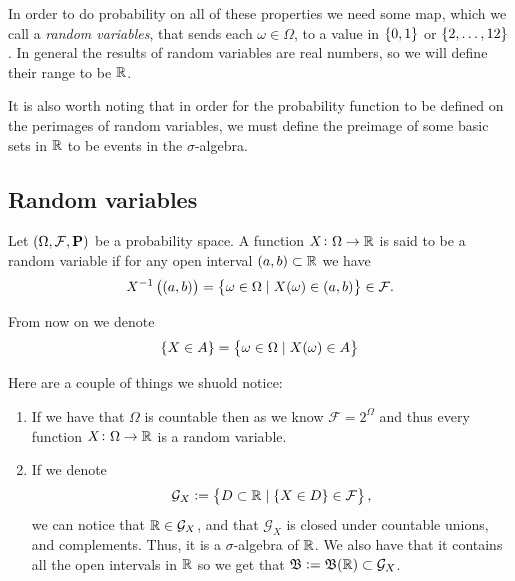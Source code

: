 \documentclass[11pt,a4paper]{article}
\begin{document}
In order to do probability on all of these properties we need some
map, which we call a \textit{random variables},
that sends each $\omega \in \Omega$,
to a value in $\left\{0,1\right\}$ or $\left\{2,\dots,12\right\}$.
In general the results of random variables are real numbers,
so we will define their range to be $\mathbb{R}$.

It is also worth noting that in order for the probability function
to be defined on the perimages of random variables,
we must define the preimage of some basic sets in $\mathbb{R}$ to be events
in the $\sigma$-algebra.

\subsection{Random variables}
\begin{definition}
  Let $(\Omega, \mathcal F, \mathbf{P})$ be a probability space.
  A function $X \colon \Omega \to \mathbb{R}$ is said to be a random variable if for
  any open interval $(a,b) \subset \mathbb{R}$ we have
  \[
    X^{-1}\left((a,b)\right) = 
    \left\{\omega \in \Omega \mid X(\omega) \in (a,b)\right\} \in \mathcal F.
  \]
\end{definition}
\begin{remark}
  From now on we denote
  \[
    \{X \in A\} = \left\{\omega \in \Omega \mid X(\omega) \in A\right\}
  \]
\end{remark}

Here are a couple of things we shuold notice:
\begin{enumerate}
  \item[(1)] If we have that $\Omega$ is countable then as we know 
  $\mathcal F = 2^\Omega$ and thus every function $X \colon \Omega \to \mathbb{R}$
  is a random variable.
  \item[(2)] If we denote 
  \[
    \mathcal G_X := \left\{D \subset \mathbb{R} \mid \left\{X \in D\right\} \in \mathcal F\right\},
  \]
  we can notice that $\mathbb{R} \in \mathcal G_X$, and that $\mathcal G_X$ is
  closed under countable unions, and complements. 
  Thus, it is a $\sigma$-algebra of $\mathbb{R}$.
  We also have that it contains all the open intervals in $\mathbb{R}$ so we
  get that $\mathfrak B := \mathfrak B(\mathbb{R}) \subset \mathcal G_X$.
\end{enumerate}
\end{document}
